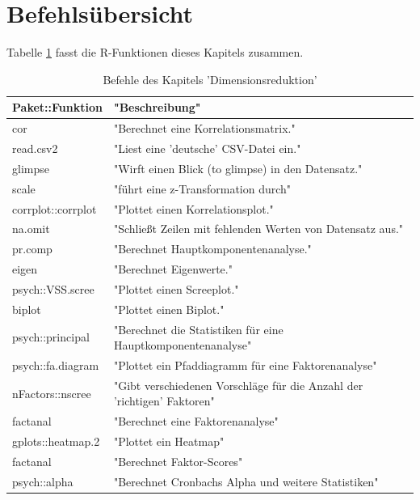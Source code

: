 \documentclass[12pt,ngerman,]{book}
\theoremstyle{definition}
\theoremstyle{definition}
\theoremstyle{remark}
\begin{document}
\section{Befehlsübersicht}\label{befehlsubersicht-10}

Tabelle \ref{tab:befehle-dimred} fasst die R-Funktionen dieses Kapitels
zusammen.

\begin{table}

\caption{\label{tab:befehle-dimred}Befehle des Kapitels 'Dimensionsreduktion'}
\centering
\begin{tabular}[t]{l|l}
\hline
Paket::Funktion & "Beschreibung"\\
\hline
cor & "Berechnet eine Korrelationsmatrix."\\
\hline
read.csv2 & "Liest eine 'deutsche' CSV-Datei ein."\\
\hline
glimpse & "Wirft einen Blick (to glimpse) in den Datensatz."\\
\hline
scale & "führt eine z-Transformation durch"\\
\hline
corrplot::corrplot & "Plottet einen Korrelationsplot."\\
\hline
na.omit & "Schließt Zeilen mit fehlenden Werten von Datensatz aus."\\
\hline
pr.comp & "Berechnet Hauptkomponentenanalyse."\\
\hline
eigen & "Berechnet Eigenwerte."\\
\hline
psych::VSS.scree & "Plottet einen Screeplot."\\
\hline
biplot & "Plottet einen Biplot."\\
\hline
psych::principal & "Berechnet die Statistiken für eine Hauptkomponentenanalyse"\\
\hline
psych::fa.diagram & "Plottet ein Pfaddiagramm für eine Faktorenanalyse"\\
\hline
nFactors::nscree & "Gibt verschiedenen Vorschläge für die Anzahl der 'richtigen' Faktoren"\\
\hline
factanal & "Berechnet eine Faktorenanalyse"\\
\hline
gplots::heatmap.2 & "Plottet ein Heatmap"\\
\hline
factanal & "Berechnet Faktor-Scores"\\
\hline
psych::alpha & "Berechnet Cronbachs Alpha und weitere Statistiken"\\
\hline
\end{tabular}
\end{table}
\end{document}
